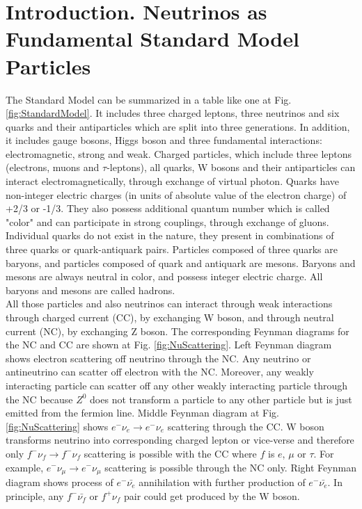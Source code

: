 \section{Introduction. Neutrinos as Fundamental Standard Model Particles}

The Standard Model can be summarized in a table like one at Fig. \ref{fig:StandardModel}. It includes three charged leptons, three neutrinos and six quarks and their antiparticles which are split into three generations. In addition, it includes gauge bosons, Higgs boson and three fundamental interactions: electromagnetic, strong and weak. Charged particles, which include three leptons (electrons, muons and $\tau$-leptons), all quarks, W bosons and their antiparticles can interact electromagnetically, through exchange of virtual photon. Quarks have non-integer electric charges (in units of absolute value of the electron charge) of +2/3 or -1/3. They also possess additional quantum number which is called "color" and can participate in strong couplings, through exchange of gluons. Individual quarks do not exist in the nature, they present in combinations of three quarks or quark-antiquark pairs. Particles composed of three quarks are baryons, and particles composed of quark and antiquark are mesons. Baryons and mesons are always neutral in color, and possess integer electric charge. All baryons and mesons are called hadrons.\\  

All those particles and also neutrinos can interact through weak interactions through charged current (CC), by exchanging W boson, and through neutral current (NC), by exchanging Z boson. The corresponding Feynman diagrams for the NC and CC are shown at Fig. \ref{fig:NuScattering}. Left Feynman diagram shows electron scattering off neutrino through the NC. Any neutrino or antineutrino can scatter off electron with the NC. Moreover, any weakly interacting particle can scatter off any other weakly interacting particle through the NC because $Z^0$ does not transform a particle to any other particle but is just emitted from the fermion line. Middle Feynman diagram at Fig. \ref{fig:NuScattering} shows $e^- \nu_e \rightarrow e^- \nu_e$ scattering through the CC. W boson transforms neutrino into corresponding charged lepton or vice-verse and therefore only $f^- \nu_f \rightarrow f^- \nu_f$ scattering is possible with the CC where $f$ is $e$, $\mu$ or $\tau$. For example, $e^- \nu_\mu \rightarrow e^- \nu_\mu$ scattering is possible through the NC only. Right Feynman diagram shows process of $e^- \bar{\nu_e}$ annihilation with further production of $e^- \bar{\nu_e}$. In principle, any $f^- \bar{\nu_f}$ or $f^+ \nu_f$ pair could get produced by the W boson.\\

